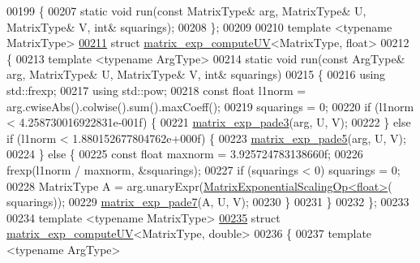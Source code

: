 \begin{DoxyCode}
00199 \{
00207   \textcolor{keyword}{static} \textcolor{keywordtype}{void} run(\textcolor{keyword}{const} MatrixType& arg, MatrixType& U, MatrixType& V, \textcolor{keywordtype}{int}& squarings);
00208 \};
00209 
00210 \textcolor{keyword}{template} <\textcolor{keyword}{typename} MatrixType>
\hyperlink{struct_eigen_1_1internal_1_1matrix__exp__compute_u_v_3_01_matrix_type_00_01float_01_4}{00211} \textcolor{keyword}{struct }\hyperlink{struct_eigen_1_1internal_1_1matrix__exp__compute_u_v}{matrix\_exp\_computeUV}<MatrixType, float>
00212 \{
00213   \textcolor{keyword}{template} <\textcolor{keyword}{typename} ArgType>
00214   \textcolor{keyword}{static} \textcolor{keywordtype}{void} run(\textcolor{keyword}{const} ArgType& arg, MatrixType& U, MatrixType& V, \textcolor{keywordtype}{int}& squarings)
00215   \{
00216     \textcolor{keyword}{using} std::frexp;
00217     \textcolor{keyword}{using} std::pow;
00218     \textcolor{keyword}{const} \textcolor{keywordtype}{float} l1norm = arg.cwiseAbs().colwise().sum().maxCoeff();
00219     squarings = 0;
00220     \textcolor{keywordflow}{if} (l1norm < 4.258730016922831e-001f) \{
00221       \hyperlink{namespace_eigen_1_1internal_a7e6cf2e01b6fb376d33b9bb8183e5777}{matrix\_exp\_pade3}(arg, U, V);
00222     \} \textcolor{keywordflow}{else} \textcolor{keywordflow}{if} (l1norm < 1.880152677804762e+000f) \{
00223       \hyperlink{namespace_eigen_1_1internal_af4992d182490219270a24aaa8285e63a}{matrix\_exp\_pade5}(arg, U, V);
00224     \} \textcolor{keywordflow}{else} \{
00225       \textcolor{keyword}{const} \textcolor{keywordtype}{float} maxnorm = 3.925724783138660f;
00226       frexp(l1norm / maxnorm, &squarings);
00227       \textcolor{keywordflow}{if} (squarings < 0) squarings = 0;
00228       MatrixType A = arg.unaryExpr(\hyperlink{struct_eigen_1_1internal_1_1_matrix_exponential_scaling_op}{MatrixExponentialScalingOp<float>}(
      squarings));
00229       \hyperlink{namespace_eigen_1_1internal_a1abecb439e6cb1b5188828cdb7e0ab60}{matrix\_exp\_pade7}(A, U, V);
00230     \}
00231   \}
00232 \};
00233 
00234 \textcolor{keyword}{template} <\textcolor{keyword}{typename} MatrixType>
\hyperlink{struct_eigen_1_1internal_1_1matrix__exp__compute_u_v_3_01_matrix_type_00_01double_01_4}{00235} \textcolor{keyword}{struct }\hyperlink{struct_eigen_1_1internal_1_1matrix__exp__compute_u_v}{matrix\_exp\_computeUV}<MatrixType, double>
00236 \{
00237   \textcolor{keyword}{template} <\textcolor{keyword}{typename} ArgType>

\end{DoxyCode}
